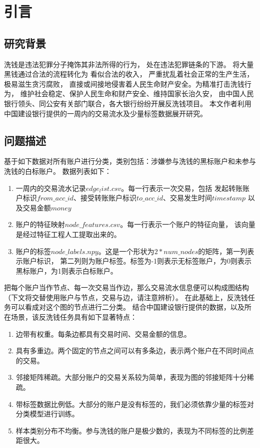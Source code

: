 
\chapter{引言} \label{chpt:A} 
  \section{研究背景}
  \begin{spacing}{1.5}
    洗钱是违法犯罪分子掩饰其非法所得的行为，
    处在违法犯罪链条的下游。
    将大量黑钱通过合法的流程转化为
    看似合法的收入，
    严重扰乱着社会正常的生产生活，极易滋生贪污腐败，
    直接或间接地侵害着人民生命财产安全。为精准打击洗钱行为，
    维护社会稳定、保护人民生命和财产安全、维持国家长治久安，
    由中国人民银行领头、同公安有关部门联合，各大银行纷纷开展反洗钱项目。
    本文作者利用中国建设银行提供的一周内的交易流水及少量标签数据展开研究。
  
  \end{spacing}


  \section{问题描述}
  基于如下数据对所有账户进行分类，类别包括：涉嫌参与洗钱的黑标账户和未参与洗钱的白标账户。
  数据列表如下：
  \begin{enumerate}
    \item 一周内的交易流水记录$edge_list.csv$。每一行表示一次交易，包括
    发起转账账户标识$from\_acc\_id$、接受转账账户标识$to\_acc\_id$、交易发生时间$timestamp$
    以及交易金额$money$
    \item 账户的特征映射$node\_features.csv$。每一行表示一个账户的特征向量，
    该向量是经过特征工程人工提取出来的。
    \item 账户的标签$node\_labels.npy$。这是一个形状为$2*num\_nodes$的矩阵，第一列表示账户标识，
    第二列则为账户标签。标签为-1则表示无标签账户，为0则表示黑标账户，为1则表示白标账户。
  \end{enumerate}


  把每个账户当作节点、每一次交易当作边，那么交易流水信息便可以构成图结构（下文将交替使用账户与节点，交易与边，请注意辨析）。
  在此基础上，反洗钱任务可以看成对这个图的节点进行二分类。
  结合中国建设银行提供的数据，以及所在场景，该反洗钱任务具有如下显著特点：
  \begin{enumerate}
    \item 边带有权重。每条边都具有交易时间、交易金额的信息。
    \item 具有多重边。两个固定的节点之间可以有多条边，表示两个账户在不同时间点的交易。
    \item 邻接矩阵稀疏。大部分账户的交易关系较为简单，表现为图的邻接矩阵十分稀疏。
    \item 带标签数据比例低。大部分的账户是没有标签的，我们必须依靠少量的标签对分类模型进行训练。
    \item 样本类别分布不均衡。参与洗钱的账户是极少数的，表现为不同标签的比例差距很大。
  \end{enumerate}

